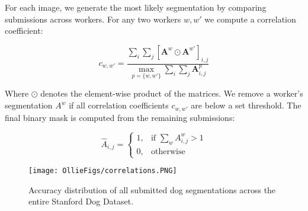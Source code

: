 


For each image, we generate the most likely segmentation by comparing submissions across workers. For any two workers $w, w'$ we compute a correlation coefficient:

\begin{equation}
c_{w,w'} = \frac{\sum_i\sum_j \left[ \mathbf{A}^{w} \odot \mathbf{A}^{w'} \right]_{i,j}}{\max\limits_{p = \{w,w'\}} \sum_{i} \sum_{j} \mathbf{A}^p_{i,j}}
\end{equation}


Where $\odot$ denotes the element-wise product of the matrices. We remove a worker's segmentation $A^{w}$ if all correlation coefficients $c_{w,w'}$ are below a set threshold. The final binary mask is computed from the remaining submissions:

\begin{equation}
\hat{A}_{i,j} = \begin{cases}
    1, & \text{if } \sum_w A^{w}_{i,j} > 1 \\
    0,              & \text{otherwise}
\end{cases}
\end{equation}

\begin{figure}
\centering
\texttt{[image: OllieFigs/correlations.PNG]}
\caption{Accuracy distribution of all submitted dog segmentations across the entire Stanford Dog Dataset.}
\label{fig:accuracy distribution}
\end{figure}

